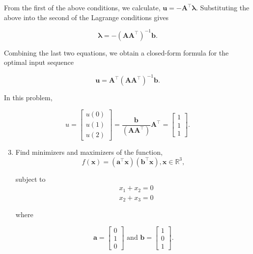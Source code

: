 From the first of the above conditions, we calculate, \(\boldsymbol{u}=-\boldsymbol{A}^{\top} \boldsymbol{\lambda} \). Substituting the above into the second of the Lagrange conditions gives

\[
	\boldsymbol{\lambda}=-\left(\boldsymbol{A} \boldsymbol{A}^{\top}\right)^{-1} \boldsymbol{b} .
\]

Combining the last two equations, we obtain a closed-form formula for the optimal input sequence

\[
	\boldsymbol{u}=\boldsymbol{A}^{\top}\left(\boldsymbol{A} \boldsymbol{A}^{\top}\right)^{-1} \boldsymbol{b} .
\]

In this problem,

\[
	u=\left[\begin{array}{l}
		u(0) \\
		u(1) \\
		u(2)
	\end{array}\right]=\frac{\boldsymbol{b}}{\left(\boldsymbol{A} \boldsymbol{A}^{\top}\right)} \boldsymbol{A}^{\top}=\left[\begin{array}{l}
		1 \\
		1 \\
		1
	\end{array}\right] .
\]

\begin{enumerate}
	\setcounter{enumi}{2}
	\item Find minimizers and maximizers of the function,
	\[
		f(\boldsymbol{x})=\left(\boldsymbol{a}^{\top} \boldsymbol{x}\right)\left(\boldsymbol{b}^{\top} \boldsymbol{x}\right), \boldsymbol{x} \in \mathbb{R}^{3},
	\]

	subject to
	\[
		\begin{aligned}
			& x_{1}+x_{2}=0 \\
			& x_{2}+x_{3}=0
		\end{aligned}
	\]

	where
	
	\[
		\boldsymbol{a}=\left[\begin{array}{l}
			0 \\
			1 \\
			0
		\end{array}\right] \text { and } \boldsymbol{b}=\left[\begin{array}{l}
			1 \\
			0 \\
			1
		\end{array}\right] .
	\]
\end{enumerate}

